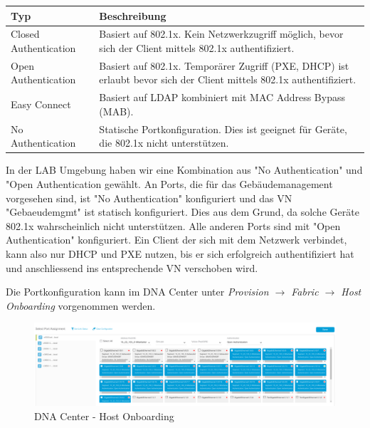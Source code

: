 \begin{table}[H]
	\centering
		\begin{tabular}{ | m{4cm} | m{12cm} | }
			\hline
			\rowcolor{gray!50}
			\textbf{Typ} & 	\textbf{Beschreibung} \\
			\hline
			Closed Authentication & Basiert auf 802.1x. Kein Netzwerkzugriff möglich, bevor sich der Client mittels 802.1x authentifiziert. \\
			\hline
			Open Authentication & Basiert auf 802.1x. Temporärer Zugriff (PXE, DHCP) ist erlaubt bevor sich der Client mittels 802.1x authentifiziert. \\
			\hline
			Easy Connect & Basiert auf LDAP kombiniert mit MAC Address Bypass (MAB).\\
			\hline
			No Authentication & Statische Portkonfiguration. Dies ist geeignet für Geräte, die 802.1x nicht unterstützen. \\
			\hline
		\end{tabular}
\end{table}

In der LAB Umgebung haben wir eine Kombination aus "No Authentication" und "Open Authentication gewählt. An Ports, die für das Gebäudemanagement vorgesehen sind, ist "No Authentication" konfiguriert und das VN "Gebaeudemgmt" ist statisch konfiguriert. Dies aus dem Grund, da solche Geräte 802.1x wahrscheinlich nicht unterstützen. 
Alle anderen Ports sind mit "Open Authentication" konfiguriert. Ein Client der sich mit dem Netzwerk verbindet, kann also nur DHCP und PXE nutzen, bis er sich erfolgreich authentifiziert hat und anschliessend ins entsprechende VN verschoben wird.

Die Portkonfiguration kann im DNA Center unter \textit{Provision $\rightarrow$ Fabric $\rightarrow$ Host Onboarding} vorgenommen werden.

\begin{figure}[H]
	\centering
	\includegraphics[width=16cm]{img/secondtry/dna-center-host-onboarding.png}
	\caption{DNA Center - Host Onboarding}
	\label{fig:dna-center-host-onboarding}
\end{figure}


